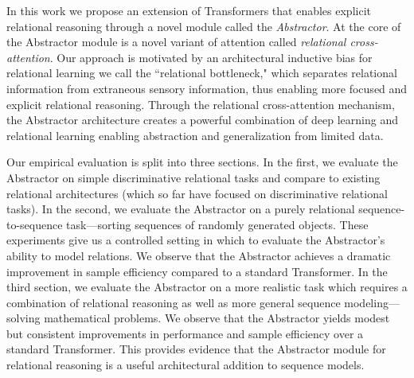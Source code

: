 In this work we propose an extension of Transformers that enables explicit relational reasoning through a novel module called the \textit{Abstractor}.
At the core of the Abstractor module is a novel variant of attention called \textit{relational cross-attention}.
Our approach is motivated by an architectural inductive bias for relational learning we call the
``relational bottleneck," 
which separates relational information from extraneous sensory information, thus enabling more focused and explicit relational reasoning.
Through the relational cross-attention mechanism, the Abstractor architecture
creates a powerful combination of deep learning and relational learning
enabling abstraction and generalization from limited data.

Our empirical evaluation is split into three sections. In the first, we evaluate the Abstractor on simple discriminative relational tasks and compare to existing relational architectures (which so far have focused on discriminative relational tasks).
In the second, we evaluate the Abstractor on a purely relational sequence-to-sequence task---sorting sequences of randomly generated objects. These experiments give us a controlled setting in which to evaluate the Abstractor's ability to model relations. We observe that the Abstractor achieves a dramatic improvement in sample efficiency compared to a standard Transformer.
In the third section, we evaluate the Abstractor on a more realistic task which requires a combination of relational reasoning as well as more general sequence modeling---solving mathematical problems. We observe that the Abstractor yields modest but consistent improvements in performance and sample efficiency over a standard Transformer. This provides evidence that the Abstractor module for relational reasoning is a useful architectural addition to sequence models.

